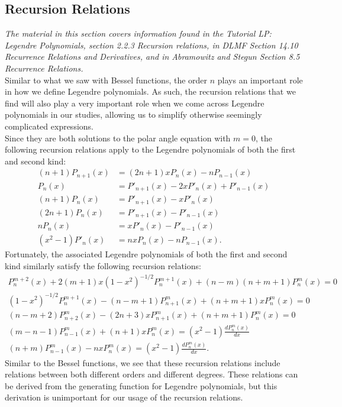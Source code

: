 \documentclass[11pt]{report}
\begin{document}
\subsection{Recursion Relations}

\emph{The material in this section covers information found in the Tutorial LP: Legendre Polynomials, section 2.2.3 Recursion relations, in DLMF Section 14.10 Recurrence Relations and Derivatives, and in Abramowitz and Stegun Section 8.5 Recurrence Relations.}\\

Similar to what we saw with Bessel functions, the order $n$ plays an important role in how we define Legendre polynomials. As such, the recursion relations that we find will also play a very important role when we come across Legendre polynomials in our studies, allowing us to simplify otherwise seemingly complicated expressions.\\

Since they are both solutions to the polar angle equation with $m=0$, the following recursion relations apply to the Legendre polynomials of both the first and second kind:
    \begin{align}
        (n+1)P_{n+1}(x) &= (2n+1)xP_n(x) - nP_{n-1}(x)\\
        P_n(x) &= P'_{n+1}(x) - 2xP'_n(x) + P'_{n-1}(x)\\
        (n+1)P_n(x) &= P'_{n+1}(x) - xP'_n(x)\\
        (2n+1)P_n(x) &= P'_{n+1}(x) - P'_{n-1}(x)\\
        nP_n(x) &= xP'_n(x) - P'_{n-1}(x)\\
        (x^2-1)P'_n(x) &= nxP_n(x) - nP_{n-1}(x).
    \end{align}
Fortunately, the associated Legendre polynomials of both the first and second kind similarly satisfy the following recursion relations:
    \begin{align}
        P_n^{m+2}(x) + 2(m+1)x(1-x^2)^{-1/2}P_n^{m+1}(x) + (n-m)(n+m+1)P_n^m(x) = 0\\
        (1-x^2)^{-1/2}P_n^{m+1}(x) - (n-m+1)P^m_{n+1}(x) + (n+m+1)xP_n^m(x) = 0\\
        (n-m+2)P^m_{n+2}(x) - (2n+3)xP^m_{n+1}(x) + (n+m+1)P_n^m(x) = 0\\
        (m-n-1)P^m_{n-1}(x) + (n+1)xP_n^m(x) = (x^2-1)\frac{dP_n^m(x)}{dx}\\
        (n+m)P^m_{n-1}(x) - nxP_n^m(x) = (x^2-1)\frac{dP_n^m(x)}{dx}.
    \end{align}
Similar to the Bessel functions, we see that these recursion relations include relations between both different orders and different degrees. These relations can be derived from the generating function for Legendre polynomials, but this derivation is unimportant for our usage of the recursion relations.
\end{document}
